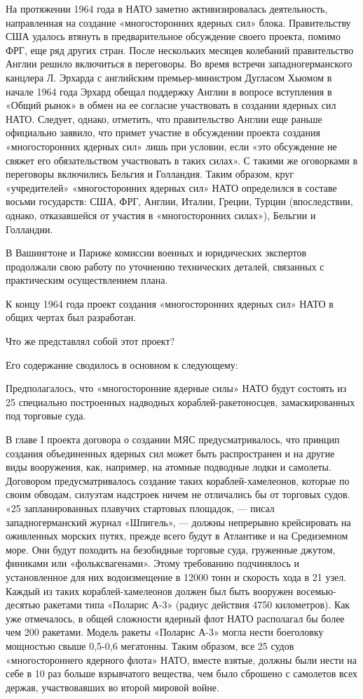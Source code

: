 \documentclass[12pt, a4paper, openany]{book}
\begin{document}
	На протяжении 1964 года в НАТО заметно активизировалась деятельность, направленная на создание «многосторонних ядерных сил» блока. Правительству США удалось втянуть в предварительное обсуждение своего проекта, помимо ФРГ, еще ряд других стран. После нескольких месяцев колебаний правительство Англии решило включиться в переговоры. Во время встречи западногерманского канцлера Л. Эрхарда с английским премьер-министром Дугласом Хьюмом в начале 1964 года Эрхард обещал поддержку Англии в вопросе вступления в «Общий рынок» в обмен на ее согласие участвовать в создании ядерных сил НАТО. Следует, однако, отметить, что правительство Англии еще раньше официально заявило, что примет участие в обсуждении проекта создания «многосторонних ядерных сил» лишь при условии, если «это обсуждение не свяжет его обязательством участвовать в таких силах». С такими же оговорками в переговоры включились Бельгия и Голландия. Таким образом, круг «учредителей» «многосторонних ядерных сил» НАТО определился в составе восьми государств: США, ФРГ, Англии, Италии, Греции, Турции (впоследствии, однако, отказавшейся от участия в «многосторонних силах»), Бельгии и Голландии.
	
	В Вашингтоне и Париже комиссии военных и юридических экспертов продолжали свою работу по уточнению технических деталей, связанных с практическим осуществлением плана.
	
	К концу 1964 года проект создания «многосторонних ядерных сил» НАТО в общих чертах был разработан.
	
	Что же представлял собой этот проект?
	
	Его содержание сводилось в основном к следующему:
	
	Предполагалось, что «многосторонние ядерные силы» НАТО будут состоять из 25 специально построенных надводных кораблей-ракетоносцев, замаскированных под торговые суда.
	
	В главе I проекта договора о создании МЯС предусматривалось, что принцип создания объединенных ядерных сил может быть распространен и на другие виды вооружения, как, например, на атомные подводные лодки и самолеты. Договором предусматривалось создание таких кораблей-хамелеонов, которые по своим обводам, силуэтам надстроек ничем не отличались бы от торговых судов. «25 запланированных плавучих стартовых площадок, — писал западногерманский журнал «Шпигель», — должны непрерывно крейсировать на оживленных морских путях, прежде всего будут в Атлантике и на Средиземном море. Они будут походить на безобидные торговые суда, груженные джутом, финиками или «фольксвагенами». Этому требованию подчинялось и установленное для них водоизмещение в 12000 тонн и скорость хода в 21 узел. Каждый из таких кораблей-хамелеонов должен был быть вооружен восемью-десятью ракетами типа «Поларис А-3» (радиус действия 4750 километров). Как уже отмечалось, в общей сложности ядерный флот НАТО располагал бы более чем 200 ракетами. Модель ракеты «Поларис А-3» могла нести боеголовку мощностью свыше 0,5-0,6 мегатонны. Таким образом, все 25 судов «многостороннего ядерного флота» НАТО, вместе взятые, должны были нести на себе в 10 раз больше взрывчатого вещества, чем было сброшено с самолетов всех держав, участвовавших во второй мировой войне.
	
\end{document}

